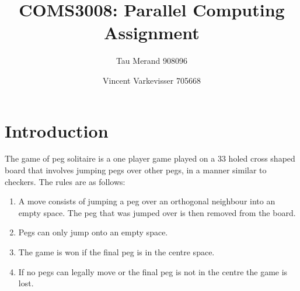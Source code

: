 \documentclass[12pt,a4paper]{report}
\begin{document}
\parindent0pt

\title{COMS3008: Parallel Computing Assignment}
\author{Tau Merand 908096 \and Vincent Varkevisser 705668}
\maketitle
\section*{Introduction}
The game of peg solitaire is a one player game played on a 33 holed cross shaped board that involves jumping pegs over other pegs, in a manner similar to checkers. The rules are as follows:
\begin{enumerate}
  \item A move consists of jumping a peg over an orthogonal neighbour into an empty space. The peg that was jumped over is then removed from the board.
  \item Pegs can only jump onto an empty space.
  \item The game is won if the final peg is in the centre space.
  \item If no pegs can legally move or the final peg is not in the centre the game is lost.
\end{enumerate}
\end{document}
